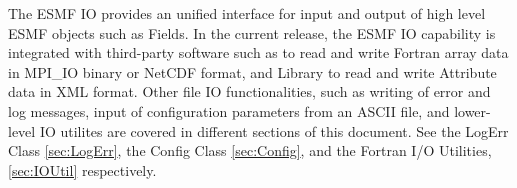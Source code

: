 

The ESMF IO provides an unified interface for input and output of
high level ESMF objects such as Fields.  In the current release, the ESMF IO 
capability is integrated with third-party software such as 
to read and write Fortran array data in MPI\_IO binary or NetCDF format, and 
Library to read and write Attribute data in XML format.  Other file IO
functionalities, such as writing of error and log messages, input of
configuration parameters from an ASCII file, and lower-level IO utilites are 
covered in different sections of this document.  See the LogErr Class 
\ref{sec:LogErr}, the Config Class \ref{sec:Config}, and the Fortran 
I/O Utilities, \ref{sec:IOUtil} respectively.


%
%


